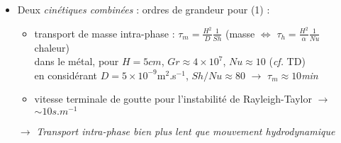 \begin{frame}
\begin{itemize}
\begin{itemize}
      {\tiny (décalage à droite de  dans l'oxyde à l’interface)}
      \item transport de masse intra-phase
      \item ``inversion'' de $\rho_{oxy} \lessgtr \rho_{met}$ $\rightarrow$ \emph{instabilité de Rayleigh-Taylor}
      \item mouvement hydrodynamique d'inversion de la position des phases
      \end{itemize}
      \item Deux \emph{cinétiques combinées} : ordres de grandeur pour \textcolor{OliveGreen}{(1)} :
      \begin{itemize}
\item transport de masse intra-phase : $\tau_m = \frac{H^2}{D} \frac{1}{Sh}$ (masse $\Leftrightarrow$ $\tau_h = \frac{H^2}{\alpha} \frac{1}{Nu}$ chaleur) \\
dans le métal, pour $H=5cm$, $Gr\approx4\times 10^{7}$, $Nu\approx10$ (\textit{cf.} TD) \\
en considérant $D=5\times 10^{-9}$m$^2$.s$^{-1}$, $Sh/Nu\approx80$ $\rightarrow$ \emph{$\tau_m \approx 10$min}
\item vitesse terminale de goutte pour l'instabilité de Rayleigh-Taylor $\rightarrow$ \emph{$\sim 10s.m^{-1}$}
      \end{itemize}
      \hskip -0.5cm $\rightarrow$ \emph{Transport intra-phase bien plus lent que mouvement hydrodynamique}
\end{itemize}
    \end{frame}

